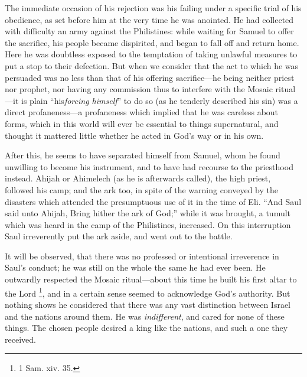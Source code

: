 The immediate occasion of his rejection was his failing under a
specific trial of his obedience, as set before him at the very time he
was anointed. He had collected with difficulty an army against the
Philistines: while waiting for Samuel to offer the sacrifice, his
people became dispirited, and began to fall off and return home. Here
he was doubtless exposed to the temptation of taking unlawful measures
to put a stop to their defection. But when we consider that the act to
which he was persuaded was no less than that of his offering sacrifice—he
being neither priest nor prophet, nor having any commission thus to
interfere with the Mosaic ritual—it is plain ``his\emph{forcing
himself}'' to do so (as he tenderly described his sin) was a
direct profaneness—a profaneness which implied that he was careless
about forms, which in this world will ever be essential to things
supernatural, and thought it mattered little whether he acted in God's
way or in his own.

After this, he seems to have separated himself from Samuel, whom he
found unwilling to become his instrument, and to have had recourse to
the priesthood instead. Ahijah or Ahimelech (as he is afterwards
called), the high priest, followed his camp; and the ark too, in spite
of the warning conveyed by the disasters which attended the
presumptuous use of it in the time of Eli. ``And Saul said unto
Ahijah, Bring hither the ark of God;'' while it was brought, a
tumult which was heard in the camp of the Philistines, increased. On
this interruption Saul irreverently put the ark aside, and went out to
the battle.

It will be observed, that there was no professed or intentional
irreverence in Saul's conduct; he was still on the whole the same he
had ever been. He outwardly respected the Mosaic ritual—about this
time he built his first altar to the Lord \footnote{1 Sam. xiv. 35.}, and in a certain sense seemed to acknowledge God's
authority. But nothing shows he considered that there was any vast
distinction between Israel and the nations around them. He was \emph{indifferent},
and cared for none of these things. The chosen people desired a king
like the nations, and such a one they received.

